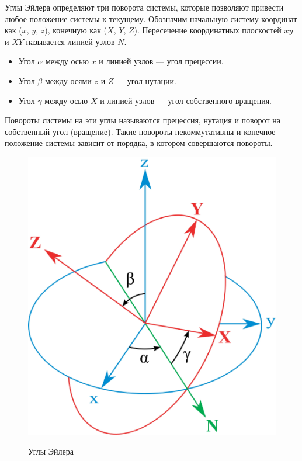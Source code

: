 Углы Эйлера определяют три поворота системы, которые позволяют привести любое положение системы к текущему.
Обозначим начальную систему координат как ($x$, $y$, $z$), конечную как ($X$, $Y$, $Z$).
Пересечение координатных плоскостей $xy$ и $XY$ называется линией узлов $N$.
\begin{itemize}
  \item Угол $\alpha$ между осью $x$ и линией узлов --- угол прецессии.
  \item Угол $\beta$ между осями $z$ и $Z$ --- угол нутации.
  \item Угол $\gamma$ между осью $X$ и линией узлов --- угол собственного вращения.
\end{itemize}
  
Повороты системы на эти углы называются прецессия, нутация и поворот на собственный угол (вращение).
Такие повороты некоммутативны и конечное положение системы зависит от порядка, в котором совершаются повороты. 

\begin{figure}[ht!]
\begin{center}
\includegraphics[scale=0.25]{./Rigidbody/Eulerangles.eps}  \\
\caption{Углы Эйлера}\label{Eulerangles}
\end{center}
\end{figure}

